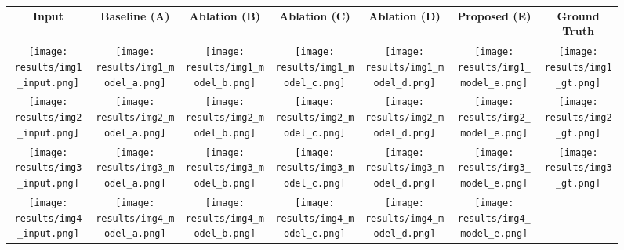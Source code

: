 \documentclass{article}
\begin{document}
\begin{figure*}[h!]
    \centering
    \tiny
    \def\imgwidth{0.13\textwidth}
    \begin{tabular}{@{}ccccccc@{}}
        \textbf{Input} & 
        \textbf{Baseline (A)} & 
        \textbf{Ablation (B)} & 
        \textbf{Ablation (C)} & 
        \textbf{Ablation (D)} & 
        \textbf{Proposed (E)} & 
        \textbf{Ground Truth} \\
        \texttt{[image: results/img1\_input.png]} &
        \texttt{[image: results/img1\_model\_a.png]} &
        \texttt{[image: results/img1\_model\_b.png]} &
        \texttt{[image: results/img1\_model\_c.png]} &
        \texttt{[image: results/img1\_model\_d.png]} &
        \texttt{[image: results/img1\_model\_e.png]} &
        \texttt{[image: results/img1\_gt.png]} \\
        \texttt{[image: results/img2\_input.png]} &
        \texttt{[image: results/img2\_model\_a.png]} &
        \texttt{[image: results/img2\_model\_b.png]} &
        \texttt{[image: results/img2\_model\_c.png]} &
        \texttt{[image: results/img2\_model\_d.png]} &
        \texttt{[image: results/img2\_model\_e.png]} &
        \texttt{[image: results/img2\_gt.png]} \\
        \texttt{[image: results/img3\_input.png]} &
        \texttt{[image: results/img3\_model\_a.png]} &
        \texttt{[image: results/img3\_model\_b.png]} &
        \texttt{[image: results/img3\_model\_c.png]} &
        \texttt{[image: results/img3\_model\_d.png]} &
        \texttt{[image: results/img3\_model\_e.png]} &
        \texttt{[image: results/img3\_gt.png]} \\
        \texttt{[image: results/img4\_input.png]} &
        \texttt{[image: results/img4\_model\_a.png]} &
        \texttt{[image: results/img4\_model\_b.png]} &
        \texttt{[image: results/img4\_model\_c.png]} &
        \texttt{[image: results/img4\_model\_d.png]} &
        \texttt{[image: results/img4\_model\_e.png]} &

\end{tabular}
\end{figure*}
\end{document}
